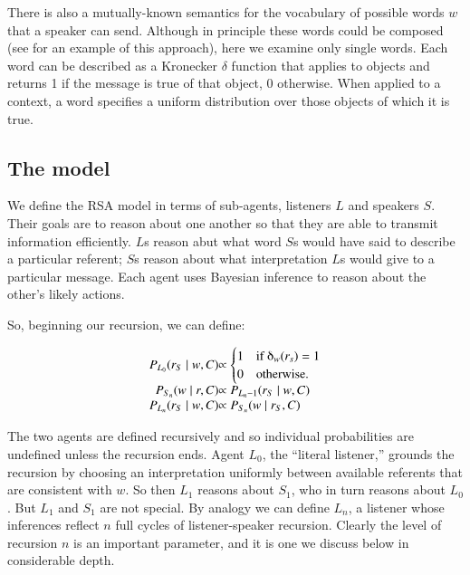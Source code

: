 \documentclass[man,noapacite]{apa2}
\begin{document}
There is also a mutually-known semantics for the vocabulary of possible words $w$ that a speaker can send. Although in principle these words could be composed (see  for an example of this approach), here we examine only single words. Each word can be described as a Kronecker $\delta$ function that applies to objects and returns 1 if the message is true of that object, 0 otherwise. When applied to a context, a word specifies a uniform distribution over those objects of which it is true.

\subsection{The model}

We define the RSA model in terms of sub-agents, listeners $L$ and speakers $S$. Their goals are to reason about one another so that they are able to transmit information efficiently. $L$s reason abut what word $S$s would have said to describe a particular referent; $S$s reason about what interpretation $L$s would give to a particular message. Each agent uses Bayesian inference to reason about the other's likely actions.

So, beginning our recursion, we can define:

\begin{equation}
  \begin{array}{r@{}l}
    \label{eq:agents}
    P_{L_0}(r_S \mid w, C) & \propto \begin{cases} 1 &\mbox{if } \delta_w(r_s) = 1 \\
0 & \mbox{otherwise.} \end{cases} \\
    P_{S_n}(w \mid r, C) & \propto P_{L_n-1} (r_S \mid w, C)  \\
    P_{L_n}(r_S \mid w, C) & \propto P_{S_n} (w \mid r_S, C)\\
  \end{array}
\end{equation}

The two agents are defined recursively and so individual probabilities are undefined unless the recursion ends.  Agent $L_0$, the ``literal listener,'' grounds the recursion by choosing an interpretation uniformly between available referents that are consistent with $w$. So then $L_1$ reasons about $S_1$, who in turn reasons about $L_0$. But $L_1$ and $S_1$ are not special. By analogy we can define $L_n$, a listener whose inferences reflect $n$ full cycles of listener-speaker recursion. Clearly the level of recursion $n$ is an important parameter, and it is one we discuss below in considerable depth.
\end{document}

